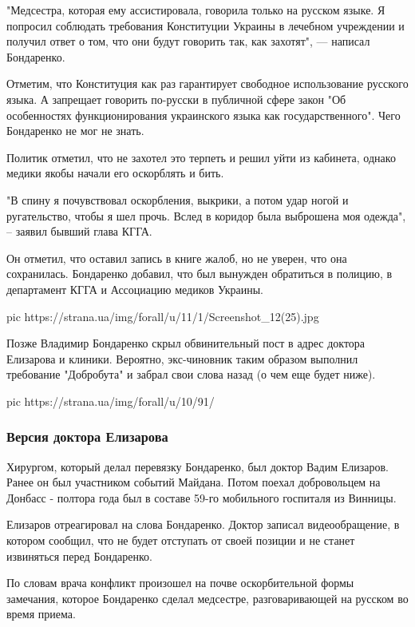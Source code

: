 "Медсестра, которая ему ассистировала, говорила только на русском языке. Я
попросил соблюдать требования Конституции Украины в лечебном учреждении и
получил ответ о том, что они будут говорить так, как захотят", --- написал
Бондаренко.

Отметим, что Конституция как раз гарантирует свободное использование русского
языка. А запрещает говорить по-русски в публичной сфере закон "Об особенностях
функционирования украинского языка как государственного". Чего Бондаренко не
мог не знать. 

Политик отметил, что не захотел это терпеть и решил уйти из кабинета, однако
медики якобы начали его оскорблять и бить. 

"В спину я почувствовал оскорбления, выкрики, а потом удар ногой и
ругательство, чтобы я шел прочь. Вслед в коридор была выброшена моя одежда", –
заявил бывший глава КГГА. 

Он отметил, что оставил запись в книге жалоб, но не уверен, что она
сохранилась. Бондаренко добавил, что был вынужден обратиться в полицию, в
департамент КГГА и Ассоциацию медиков Украины.

\ifcmt
pic https://strana.ua/img/forall/u/11/1/Screenshot_12(25).jpg
\fi

Позже Владимир Бондаренко скрыл обвинительный пост в адрес доктора Елизарова и
клиники. Вероятно, экс-чиновник таким образом выполнил требование "Добробута" и
забрал свои слова назад (о чем еще будет ниже). 

\ifcmt
pic https://strana.ua/img/forall/u/10/91/%
\fi

\subsubsection{Версия доктора Елизарова}

Хирургом, который делал перевязку Бондаренко, был доктор Вадим Елизаров. Ранее
он был участником событий Майдана. Потом поехал добровольцем на Донбасс -
полтора года был в составе 59-го мобильного госпиталя из Винницы.

Елизаров отреагировал на слова Бондаренко. Доктор записал видеообращение, в
котором сообщил, что не будет отступать от своей позиции и не станет извиняться
перед Бондаренко.

По словам врача конфликт произошел на почве оскорбительной формы замечания,
которое Бондаренко сделал медсестре, разговаривающей на русском во время
приема. 

